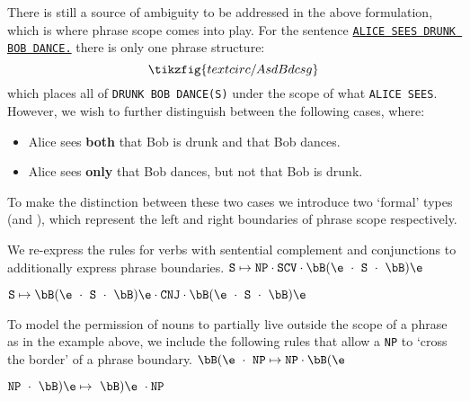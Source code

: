 There is still a source of ambiguity to be addressed in the above formulation, which is where phrase scope comes into play. For the sentence \texttt{\underline{ALICE SEES DRUNK BOB DANCE.}} there is only one phrase structure:
\[
\tikzfig{textcirc/AsdBdcsg}
\]
which places all of \texttt{DRUNK BOB DANCE(S)} under the scope of what \texttt{ALICE SEES}. However, we wish to further distinguish between the following cases, where:
\begin{itemize}
    \item Alice sees \textbf{both} that Bob is drunk and that Bob dances.
    \item Alice sees \textbf{only} that Bob dances, but not that Bob is drunk.
\end{itemize}
To make the distinction between these two cases we introduce two  `formal' types \bB(\e and \bB)\e, which represent the left and right boundaries of phrase scope respectively.

\begin{marginfigure}
\centering
{}
\caption{We re-express the rules for verbs with sentential complement and conjunctions to additionally express phrase boundaries. $\texttt{S} \mapsto \texttt{NP} \cdot \texttt{SCV} \cdot \bB ( \e \ \cdot \ \texttt{S} \ \cdot \ \bB ) \e$}
\end{marginfigure}

\begin{marginfigure}
\centering
{}
\caption{$\texttt{S} \mapsto \bB ( \e \ \cdot \ \texttt{S} \ \cdot \ \bB ) \e \cdot \texttt{CNJ} \cdot \bB ( \e \ \cdot \ \texttt{S} \ \cdot \ \bB ) \e$}
\end{marginfigure}

\begin{marginfigure}
\centering
{}
\caption{To model the permission of nouns to partially live outside the scope of a phrase as in the example above, we include the following rules that allow a \texttt{NP} to `cross the border' of a phrase boundary. $\bB ( \e \ \cdot \ \texttt{NP} \mapsto \texttt{NP} \cdot \bB ( \e$}
\end{marginfigure}

\begin{marginfigure}
\centering
{}
\caption{$\texttt{NP} \ \cdot \ \bB ) \e \mapsto \ \bB ) \e \ \cdot \texttt{NP}$}
\end{marginfigure}

